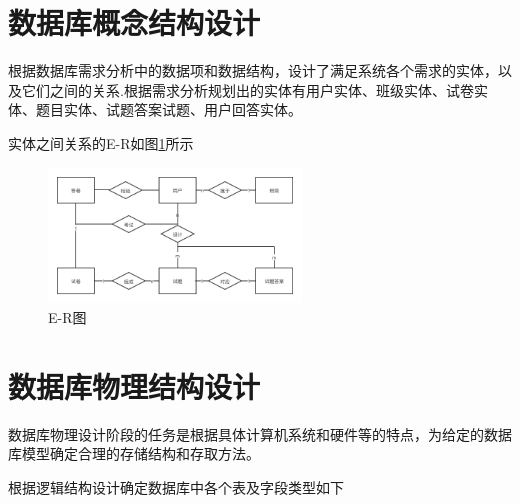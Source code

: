 \section{数据库概念结构设计}
根据数据库需求分析中的数据项和数据结构，设计了满足系统各个需求的实体，以及它们之间的关系.根据需求分析规划出的实体有用户实体、班级实体、试卷实体、题目实体、试题答案试题、用户回答实体。
\par
实体之间关系的E-R如图\ref{figure:er}所示
\begin{figure}[!htbp]
\centering
\includegraphics[width=0.6\textwidth,keepaspectratio]{data/chapter-4/er2.png}
\caption{E-R图}
\label{figure:er}
\end{figure}\section{数据库物理结构设计}
数据库物理设计阶段的任务是根据具体计算机系统和硬件等的特点，为给定的数据库模型确定合理的存储结构和存取方法。
\par
根据逻辑结构设计确定数据库中各个表及字段类型如下
